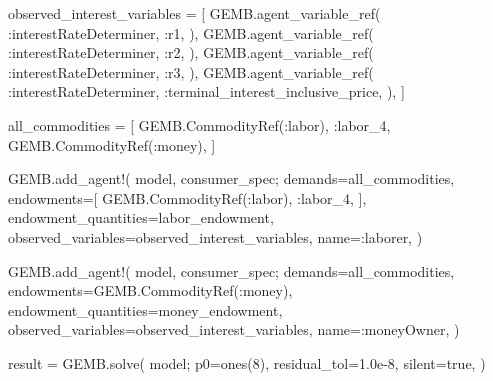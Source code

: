 \documentclass[
  letterpaper,
  DIV=11,
  numbers=noendperiod]{scrreprt}
\newenvironment{Shaded}{\begin{snugshade}}{\end{snugshade}}
\newcommand{\ConstantTok}[1]{\textcolor[rgb]{0.56,0.35,0.01}{#1}}
\newcommand{\FloatTok}[1]{\textcolor[rgb]{0.68,0.00,0.00}{#1}}
\newcommand{\FunctionTok}[1]{\textcolor[rgb]{0.28,0.35,0.67}{#1}}
\newcommand{\NormalTok}[1]{\textcolor[rgb]{0.00,0.23,0.31}{#1}}
\newcommand{\OperatorTok}[1]{\textcolor[rgb]{0.37,0.37,0.37}{#1}}
\begin{document}
\begin{codelisting}
{\begin{Shaded}
\begin{Highlighting}[]
\NormalTok{observed\_interest\_variables }\OperatorTok{=}\NormalTok{ [}
\NormalTok{    GEMB.}\FunctionTok{agent\_variable\_ref}\NormalTok{(}
        \OperatorTok{:}\NormalTok{interestRateDeterminer,}
        \OperatorTok{:}\NormalTok{r1,}
\NormalTok{    ),}
\NormalTok{    GEMB.}\FunctionTok{agent\_variable\_ref}\NormalTok{(}
        \OperatorTok{:}\NormalTok{interestRateDeterminer,}
        \OperatorTok{:}\NormalTok{r2,}
\NormalTok{    ),}
\NormalTok{    GEMB.}\FunctionTok{agent\_variable\_ref}\NormalTok{(}
        \OperatorTok{:}\NormalTok{interestRateDeterminer,}
        \OperatorTok{:}\NormalTok{r3,}
\NormalTok{    ),}
\NormalTok{    GEMB.}\FunctionTok{agent\_variable\_ref}\NormalTok{(}
        \OperatorTok{:}\NormalTok{interestRateDeterminer,}
        \OperatorTok{:}\NormalTok{terminal\_interest\_inclusive\_price,}
\NormalTok{    ),}
\NormalTok{]}

\NormalTok{all\_commodities }\OperatorTok{=}\NormalTok{ [}
\NormalTok{    GEMB.}\FunctionTok{CommodityRef}\NormalTok{(}\OperatorTok{:}\NormalTok{labor),}
    \OperatorTok{:}\NormalTok{labor\_4,}
\NormalTok{    GEMB.}\FunctionTok{CommodityRef}\NormalTok{(}\OperatorTok{:}\NormalTok{money),}
\NormalTok{]}

\NormalTok{GEMB.}\FunctionTok{add\_agent!}\NormalTok{(}
\NormalTok{    model,}
\NormalTok{    consumer\_spec;}
\NormalTok{    demands}\OperatorTok{=}\NormalTok{all\_commodities,}
\NormalTok{    endowments}\OperatorTok{=}\NormalTok{[}
\NormalTok{        GEMB.}\FunctionTok{CommodityRef}\NormalTok{(}\OperatorTok{:}\NormalTok{labor),}
        \OperatorTok{:}\NormalTok{labor\_4,}
\NormalTok{    ],}
\NormalTok{    endowment\_quantities}\OperatorTok{=}\NormalTok{labor\_endowment,}
\NormalTok{    observed\_variables}\OperatorTok{=}\NormalTok{observed\_interest\_variables,}
\NormalTok{    name}\OperatorTok{=:}\NormalTok{laborer,}
\NormalTok{)}

\NormalTok{GEMB.}\FunctionTok{add\_agent!}\NormalTok{(}
\NormalTok{    model,}
\NormalTok{    consumer\_spec;}
\NormalTok{    demands}\OperatorTok{=}\NormalTok{all\_commodities,}
\NormalTok{    endowments}\OperatorTok{=}\NormalTok{GEMB.}\FunctionTok{CommodityRef}\NormalTok{(}\OperatorTok{:}\NormalTok{money),}
\NormalTok{    endowment\_quantities}\OperatorTok{=}\NormalTok{money\_endowment,}
\NormalTok{    observed\_variables}\OperatorTok{=}\NormalTok{observed\_interest\_variables,}
\NormalTok{    name}\OperatorTok{=:}\NormalTok{moneyOwner,}
\NormalTok{)}

\NormalTok{result }\OperatorTok{=}\NormalTok{ GEMB.}\FunctionTok{solve}\NormalTok{(}
\NormalTok{    model;}
\NormalTok{    p0}\OperatorTok{=}\FunctionTok{ones}\NormalTok{(}\FloatTok{8}\NormalTok{),}
\NormalTok{    residual\_tol}\OperatorTok{=}\FloatTok{1.0e{-}8}\NormalTok{,}
\NormalTok{    silent}\OperatorTok{=}\ConstantTok{true}\NormalTok{,}
\NormalTok{)}


\end{Highlighting}
\end{Shaded}}
\end{codelisting}
\end{document}
